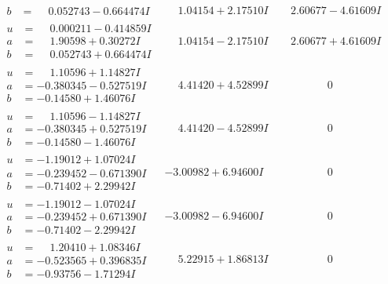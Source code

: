 \documentclass[1p]{elsarticle_modified}
\theoremstyle{definition}
\begin{document}
$$\begin{array}{c|c|c}
\begin{aligned}
b &= \phantom{-}0.052743 - 0.664474 I\end{aligned}
 & \phantom{-}1.04154 + 2.17510 I & \phantom{-}2.60677 - 4.61609 I \\ \hline\begin{aligned}
u &= \phantom{-}0.000211 - 0.414859 I \\
a &= \phantom{-}1.90598 + 0.30272 I \\
b &= \phantom{-}0.052743 + 0.664474 I\end{aligned}
 & \phantom{-}1.04154 - 2.17510 I & \phantom{-}2.60677 + 4.61609 I \\ \hline\begin{aligned}
u &= \phantom{-}1.10596 + 1.14827 I \\
a &= -0.380345 - 0.527519 I \\
b &= -0.14580 + 1.46076 I\end{aligned}
 & \phantom{-}4.41420 + 4.52899 I & \phantom{-0.000000 } 0 \\ \hline\begin{aligned}
u &= \phantom{-}1.10596 - 1.14827 I \\
a &= -0.380345 + 0.527519 I \\
b &= -0.14580 - 1.46076 I\end{aligned}
 & \phantom{-}4.41420 - 4.52899 I & \phantom{-0.000000 } 0 \\ \hline\begin{aligned}
u &= -1.19012 + 1.07024 I \\
a &= -0.239452 - 0.671390 I \\
b &= -0.71402 + 2.29942 I\end{aligned}
 & -3.00982 + 6.94600 I & \phantom{-0.000000 } 0 \\ \hline\begin{aligned}
u &= -1.19012 - 1.07024 I \\
a &= -0.239452 + 0.671390 I \\
b &= -0.71402 - 2.29942 I\end{aligned}
 & -3.00982 - 6.94600 I & \phantom{-0.000000 } 0 \\ \hline\begin{aligned}
u &= \phantom{-}1.20410 + 1.08346 I \\
a &= -0.523565 + 0.396835 I \\
b &= -0.93756 - 1.71294 I\end{aligned}
 & \phantom{-}5.22915 + 1.86813 I & \phantom{-0.000000 } 0 \\ \hline\begin{aligned}

\end{aligned}
\end{array}$$
\end{document}
